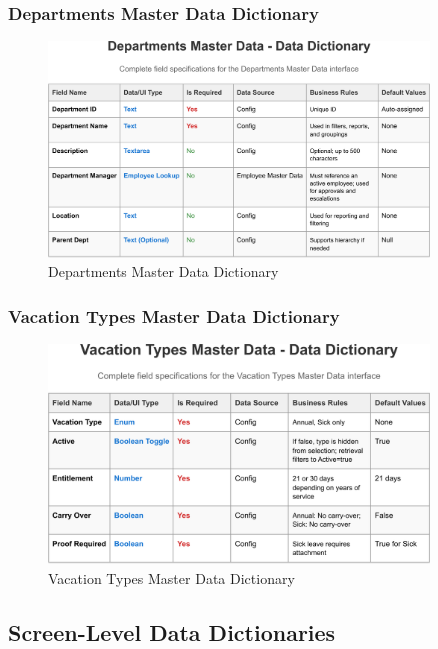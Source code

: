 \documentclass[12pt,a4paper]{article}
\begin{document}
\subsubsection{Departments Master Data Dictionary}
\begin{figure}[H]
\centering
\includegraphics[width=0.9\textwidth]{Data-Dictionary/Master-Data-Dictionaries/Departments-Master-Data-Data-Dictionary/Departments-Master-Data-Data-Dictionary-1.png}
\caption{Departments Master Data Dictionary}
\label{fig:departments-master-data}
\end{figure}

\subsubsection{Vacation Types Master Data Dictionary}
\begin{figure}[H]
\centering
\includegraphics[width=0.9\textwidth]{Data-Dictionary/Master-Data-Dictionaries/Vacation-Types-Master-Data-Data-Dictionary/Vacation-Types-Master-Data-Data-Dictionary-1.png}
\caption{Vacation Types Master Data Dictionary}
\label{fig:vacation-types-master-data}
\end{figure}

\subsection{Screen-Level Data Dictionaries}
\end{document}
